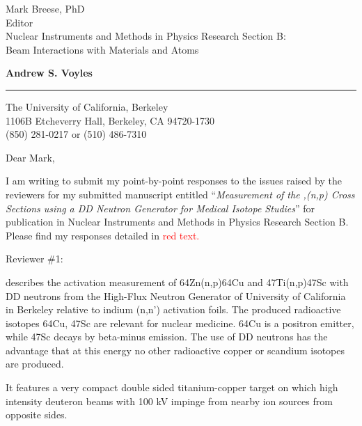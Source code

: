 \documentclass{letter} %
\newcommand{\colornote}[1]{\textcolor{red}{#1}}
\begin{document}
\signature{Andrew S. Voyles}           %
\longindentation=0pt                       %
\let\raggedleft\raggedright                %
 
 
\begin{letter}{Mark Breese, PhD \\
Editor \\
Nuclear Instruments and Methods in Physics Research Section B: \\
Beam Interactions with Materials and Atoms}


\begin{flushleft}
{\large\bf Andrew S. Voyles}
\end{flushleft}
\medskip\hrule height 1pt
\begin{flushright}
\hfill The University of California, Berkeley \\
\hfill 1106B Etcheverry Hall, Berkeley, CA  94720-1730 \\
\hfill (850) 281-0217 or (510) 486-7310 
\end{flushright} 
\vfill %

 
\opening{Dear Mark,} 

  \renewcommand*{\thefootnote}{\alph{footnote}}

  \noindent I am writing to submit my point-by-point responses to the issues raised by the reviewers for my submitted manuscript entitled \enquote{\emph{Measurement of the ,(n,p) Cross Sections using a DD Neutron Generator for Medical Isotope Studies}}  for publication in Nuclear Instruments and Methods in Physics Research Section B.  Please find my responses detailed in \colornote{red text.}

  \vfill
  
 \pagebreak
 
 
 
 Reviewer \#1:

describes the activation measurement of 64Zn(n,p)64Cu and 47Ti(n,p)47Sc with DD neutrons from the High-Flux Neutron Generator of University of California in Berkeley relative to indium (n,n') activation foils.
The produced radioactive isotopes 64Cu, 47Sc are relevant for nuclear medicine.
64Cu is a positron emitter, while 47Sc decays by beta-minus emission.
The use of DD neutrons has the advantage that at this energy no other radioactive copper or scandium isotopes are produced.

It features a very compact double sided titanium-copper target on which high intensity deuteron beams with 100 kV impinge from nearby ion sources from opposite sides.


\end{letter}
\end{document}
